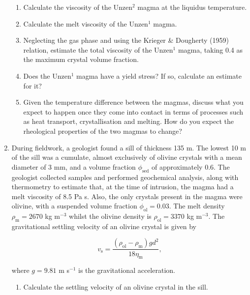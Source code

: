 \documentclass[]{book}
\theoremstyle{definition}
\begin{document}
\begin{enumerate}
  \begin{enumerate}
    \setcounter{enumii}{0}
  \item Calculate the viscosity of the Unzen$^{2}$ magma at the liquidus temperature.
  \item Calculate the melt viscosity of the Unzen$^{1}$ magma. 
  \item Neglecting the gas phase and using the Krieger \& Dougherty (1959) relation, estimate the total viscosity of the Unzen$^{1}$ magma, taking 0.4 as the maximum crystal volume fraction. \\
  \item Does the Unzen$^{1}$ magma have a yield stress? If so, calculate an estimate for it? \\
  \item Given the temperature difference between the magmas, discuss what you expect to happen once they come into contact in terms of processes such as heat transport, crystallisation and melting. How do you expect the rheological properties of the two magmas to change?
  \end{enumerate}
  

\item During fieldwork, a geologist found a sill of thickness 135 m. The lowest 10 m of the sill was a cumulate, almost exclusively of olivine crystals with a mean diameter of 3 mm, and a volume fraction $\phi_{\text{sed}}$ of approximately 0.6. The geologist collected samples and performed geochemical analysis, along with thermometry to estimate that, at the time of intrusion, the magma had a melt viscosity of 8.5 Pa s. Also, the only crystals present in the magma were olivine, with a suspended volume fraction $\phi_{\text{ol}} = 0.03$. The melt density $\rho_{\text{m}} = 2670$ kg m$^{-3}$ whilst the olivine density is $\rho_{\text{ol}} = 3370$ kg m$^{-3}$. The gravitational settling velocity of an olivine crystal is given by

  \begin{equation}
    \label{equ:Stokes}
    v_{\text{s}} = \frac{(\rho_{\text{ol}} - \rho_{\text{m}}) g d^{2}}{18 \eta_{\text{m}}},
  \end{equation}

  where $g = 9.81$ m s$^{-1}$ is the gravitational acceleration. 

  \begin{enumerate}
    \setcounter{enumii}{0}
  \item Calculate the settling velocity of an olivine crystal in the sill.
  \end{enumerate}


\end{enumerate}
\end{document}
